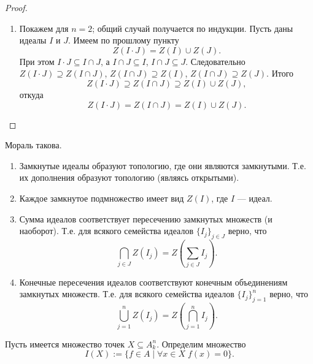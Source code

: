\documentclass[12pt,a4paper]{article}
\begin{document}
\begin{proof}
\begin{enumerate}
            \item Покажем для $n=2$; общий случай получается по индукции. Пусть даны идеалы $I$ и $J$. Имеем по прошлому пункту
                \[Z(I \cdot J) = Z(I) \cup Z(J).\]
                При этом $I \cdot J \subseteq I \cap J$, а $I \cap J \subseteq I$, $I \cap J \subseteq J$. Следовательно
                $Z(I \cdot J) \supseteq Z(I \cap J)$, $Z(I \cap J) \supseteq Z(I)$, $Z(I \cap J) \supseteq Z(J)$. Итого
                \[Z(I \cdot J) \supseteq Z(I \cap J) \supseteq Z(I) \cup Z(J),\]
                откуда
                \[Z(I \cdot J) = Z(I \cap J) = Z(I) \cup Z(J).\]
        \end{enumerate}
    \end{proof}

    \begin{corollary}
        Мораль такова.
        \begin{enumerate}
            \item Замкнутые идеалы образуют топологию, где они являются замкнутыми. Т.е. их дополнения образуют топологию (являясь открытыми).
            \item Каждое замкнутое подмножество имеет вид $Z(I)$, где $I$ --- идеал.
            \item Сумма идеалов соответствует пересечению замкнутых множеств (и наоборот). Т.е. для всякого семейства идеалов $\{I_j\}_{j \in J}$ верно, что
                \[\bigcap_{j \in J} Z(I_j) = Z\left(\sum_{j \in J} I_j\right).\]
            \item Конечные пересечения идеалов соответствуют конечным объединениям замкнутых множеств. Т.е. для всякого семейства идеалов $\{I_j\}_{j=1}^n$ верно, что
                \[\bigcup_{j=1}^n Z(I_j) = Z\left(\bigcap_{j=1}^n I_j\right).\]
        \end{enumerate}
    \end{corollary}

    \begin{definition}
        Пусть имеется множество точек $X \subseteq A_k^n$. Определим множество
        \[I(X) := \{f \in A \mid \forall x \in X\; f(x) = 0\}.\]
    \end{definition}
\end{document}

